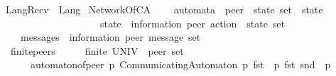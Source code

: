 \begin{isabellebody}
\ \ {\isachardoublequoteopen}LangRecv\ {\isasymequiv}\ Lang{\isasymdownharpoonright}\isactrlsub {\isacharquery}{\kern0pt}{\isachardoublequoteclose}\isanewline
\isanewline
{}\isamarkupfalse%
%
\isadelimdocument
%
\endisadelimdocument
%
\isatagdocument
%
\isamarkuptrue%
%
\endisatagdocument
{\isafolddocument}%
%
\isadelimdocument
%
\endisadelimdocument
{}\isamarkupfalse%
\ NetworkOfCA\ {\isacharequal}{\kern0pt}\isanewline
\ \ \ automata\ {\isacharcolon}{\kern0pt}{\isacharcolon}{\kern0pt}\ {\isachardoublequoteopen}{\isacharprime}{\kern0pt}peer\ {\isasymRightarrow}\ {\isacharparenleft}{\kern0pt}{\isacharprime}{\kern0pt}state\ set\ {\isasymtimes}\ {\isacharprime}{\kern0pt}state\ {\isasymtimes}\isanewline
\ \ \ \ \ \ \ \ \ \ \ \ \ \ \ \ \ \ \ \ \ {\isacharparenleft}{\kern0pt}{\isacharprime}{\kern0pt}state\ {\isasymtimes}\ {\isacharparenleft}{\kern0pt}{\isacharprime}{\kern0pt}information{\isacharcomma}{\kern0pt}\ {\isacharprime}{\kern0pt}peer{\isacharparenright}{\kern0pt}\ action\ {\isasymtimes}\ {\isacharprime}{\kern0pt}state{\isacharparenright}{\kern0pt}\ set{\isacharparenright}{\kern0pt}{\isachardoublequoteclose}\ \ {\isacharparenleft}{\kern0pt}{\isachardoublequoteopen}{\isasymA}{\isachardoublequoteclose}\ {}{}{}{}{\isacharparenright}{\kern0pt}\isanewline
\ \ \ \ \ messages\ {\isacharcolon}{\kern0pt}{\isacharcolon}{\kern0pt}\ {\isachardoublequoteopen}{\isacharparenleft}{\kern0pt}{\isacharprime}{\kern0pt}information{\isacharcomma}{\kern0pt}\ {\isacharprime}{\kern0pt}peer{\isacharparenright}{\kern0pt}\ message\ set{\isachardoublequoteclose}\ \ \ \ \ \ \ \ \ \ \ \ \ \ \ \ \ \ \ \ \ \ \ {\isacharparenleft}{\kern0pt}{\isachardoublequoteopen}{\isasymM}{\isachardoublequoteclose}\ {}{}{}{}{\isacharparenright}{\kern0pt}\isanewline
\ \ \ finite{\isacharunderscore}{\kern0pt}peers{\isacharcolon}{\kern0pt}\ \ \ \ \ \ {\isachardoublequoteopen}finite\ {\isacharparenleft}{\kern0pt}UNIV\ {\isacharcolon}{\kern0pt}{\isacharcolon}{\kern0pt}\ {\isacharprime}{\kern0pt}peer\ set{\isacharparenright}{\kern0pt}{\isachardoublequoteclose}\isanewline
\ \ \ \ \ \ \ automaton{\isacharunderscore}{\kern0pt}of{\isacharunderscore}{\kern0pt}peer{\isacharcolon}{\kern0pt}\ {\isachardoublequoteopen}{\isasymAnd}p{\isachardot}{\kern0pt}\ CommunicatingAutomaton\ p\ {\isacharparenleft}{\kern0pt}fst\ {\isacharparenleft}{\kern0pt}{\isasymA}\ p{\isacharparenright}{\kern0pt}{\isacharparenright}{\kern0pt}\ {\isacharparenleft}{\kern0pt}fst\ {\isacharparenleft}{\kern0pt}snd\ {\isacharparenleft}{\kern0pt}{\isasymA}\ p{\isacharparenright}{\kern0pt}{\isacharparenright}{\kern0pt}{\isacharparenright}{\kern0pt}\ {\isasymM}\isanewline

\end{isabellebody}
